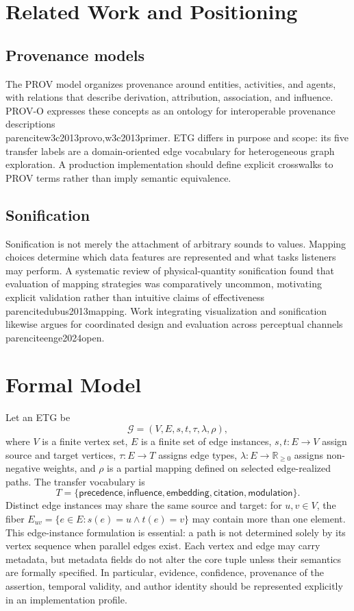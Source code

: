 \documentclass[11pt]{article}
\begin{document}
\section{Related Work and Positioning}
\subsection{Provenance models}
The PROV model organizes provenance around entities, activities, and agents, with relations that describe derivation, attribution, association, and influence. PROV-O expresses these concepts as an ontology for interoperable provenance descriptions \\parencite{w3c2013provo,w3c2013primer}. ETG differs in purpose and scope: its five transfer labels are a domain-oriented edge vocabulary for heterogeneous graph exploration. A production implementation should define explicit crosswalks to PROV terms rather than imply semantic equivalence.
\subsection{Sonification}
Sonification is not merely the attachment of arbitrary sounds to values. Mapping choices determine which data features are represented and what tasks listeners may perform. A systematic review of physical-quantity sonification found that evaluation of mapping strategies was comparatively uncommon, motivating explicit validation rather than intuitive claims of effectiveness \\parencite{dubus2013mapping}. Work integrating visualization and sonification likewise argues for coordinated design and evaluation across perceptual channels \\parencite{enge2024open}.
\section{Formal Model}
Let an ETG be
\[
\mathcal{G}=(V,E,s,t,\tau,\lambda,\rho),
\]
where $V$ is a finite vertex set, $E$ is a finite set of edge instances, $s,t:E\to V$ assign source and target vertices, $\tau:E\to T$ assigns edge types, $\lambda:E\to\mathbb{R}_{\geq 0}$ assigns non-negative weights, and $\rho$ is a partial mapping defined on selected edge-realized paths. The transfer vocabulary is
\[
T=\{\textsf{precedence},\textsf{influence},\textsf{embedding},
\textsf{citation},\textsf{modulation}\}.
\]
Distinct edge instances may share the same source and target: for $u,v\in V$, the fiber $E_{uv}=\{e\in E:s(e)=u\land t(e)=v\}$ may contain more than one element. This edge-instance formulation is essential: a path is not determined solely by its vertex sequence when parallel edges exist.
Each vertex and edge may carry metadata, but metadata fields do not alter the core tuple unless their semantics are formally specified. In particular, evidence, confidence, provenance of the assertion, temporal validity, and author identity should be represented explicitly in an implementation profile.
\end{document}

